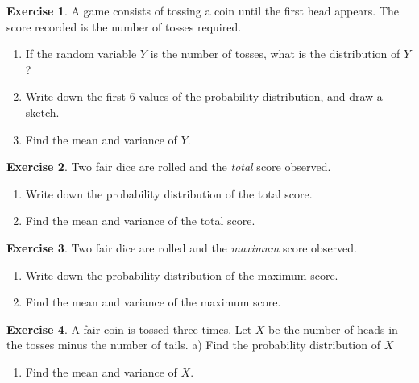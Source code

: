 \documentclass[
]{book}
\providecommand{\tightlist}{%
  \setlength{\itemsep}{0pt}\setlength{\parskip}{0pt}}
\theoremstyle{definition}
\theoremstyle{definition}
\theoremstyle{definition}
\newtheorem{exercise}{Exercise}[chapter]
\theoremstyle{definition}
\theoremstyle{remark}
\begin{document}
\begin{exercise}

A game consists of tossing a coin until the first head appears. The score recorded is the number of tosses required.

\begin{enumerate}
\def\labelenumi{\alph{enumi})}
\item
  If the random variable \(Y\) is the number of tosses, what is the distribution of \(Y\)?
\item
  Write down the first \(6\) values of the probability distribution, and draw a sketch.
\item
  Find the mean and variance of \(Y\).
\end{enumerate}

\end{exercise}

\begin{exercise}

Two fair dice are rolled and the \emph{total} score observed.

\begin{enumerate}
\def\labelenumi{\alph{enumi})}
\item
  Write down the probability distribution of the total score.
\item
  Find the mean and variance of the total score.
\end{enumerate}

\end{exercise}

\begin{exercise}

Two fair dice are rolled and the \emph{maximum} score observed.

\begin{enumerate}
\def\labelenumi{\alph{enumi})}
\item
  Write down the probability distribution of the maximum score.
\item
  Find the mean and variance of the maximum score.
\end{enumerate}

\end{exercise}

\begin{exercise}

A fair coin is tossed three times. Let \(X\) be the number of heads in the tosses minus the number of tails.
a) Find the probability distribution of \(X\)

\begin{enumerate}
\def\labelenumi{\alph{enumi})}
\setcounter{enumi}{1}
\tightlist
\item
  Find the mean and variance of \(X\).
\end{enumerate}

\end{exercise}
\end{document}
